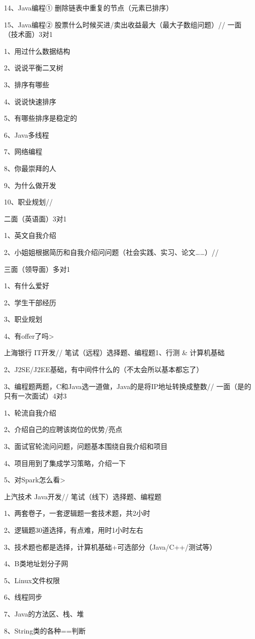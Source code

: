\documentclass[UTF8]{ctexart}
\begin{document}
14、Java编程① 删除链表中重复的节点（元素已排序）

15、Java编程② 股票什么时候买进/卖出收益最大（最大子数组问题）// 一面（技术面）3对1

1、用过什么数据结构

2、说说平衡二叉树

3、排序有哪些

4、说说快速排序

5、有哪些排序是稳定的

6、Java多线程

7、网络编程

8、你最崇拜的人

9、为什么做开发

10、职业规划// 

二面（英语面）3对1

1、英文自我介绍

2、小姐姐根据简历和自我介绍问问题（社会实践、实习、论文……）// 

三面（领导面）多对1

1、有什么爱好

2、学生干部经历

3、职业规划

4、有offer了吗> 

上海银行 IT开发// 笔试（远程）选择题、编程题1、行测 & 计算机基础

2、J2SE/J2EE基础，有中间件什么的（不太会所以基本都忘了）

3、编程题两题，C和Java选一道做，Java的是将IP地址转换成整数// 一面（是的只有一次面试）4对3

1、轮流自我介绍


2、介绍自己的应聘该岗位的优势/亮点

3、面试官轮流问问题，问题基本围绕自我介绍和项目

4、项目用到了集成学习策略，介绍一下

5、对Spark怎么看> 

上汽技术 Java开发// 笔试（线下）选择题、编程题

1、两套卷子，一套逻辑题一套技术题，共2小时

2、逻辑题30道选择，有点难，用时1小时左右

3、技术题也都是选择，计算机基础+可选部分（Java/C++/测试等）

4、B类地址划分子网

5、Linux文件权限

6、线程同步

7、Java的方法区、栈、堆

8、String类的各种==判断
\end{document}

